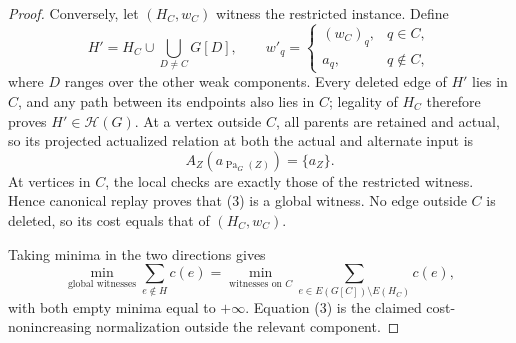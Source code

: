 \documentclass{article}
\begin{document}
\begin{proof}
Conversely, let \((H_C,w_C)\) witness the restricted instance. Define
\[
 H'=H_C\cup\bigcup_{D\ne C}G[D],
 \qquad
 w'_q=
 \begin{cases}
 (w_C)_q,&q\in C,\\
 a_q,&q\notin C,
 \end{cases} \tag{3}
\]
where \(D\) ranges over the other weak components. Every deleted edge of \(H'\) lies in \(C\), and any path between its endpoints also lies in \(C\); legality of \(H_C\) therefore proves \(H'\in\mathcal H(G)\). At a vertex outside \(C\), all parents are retained and actual, so its projected actualized relation at both the actual and alternate input is
\[
 A_Z(a_{\operatorname{Pa}_G(Z)})=\{a_Z\}. \tag{4}
\]
At vertices in \(C\), the local checks are exactly those of the restricted witness. Hence canonical replay proves that (3) is a global witness. No edge outside \(C\) is deleted, so its cost equals that of \((H_C,w_C)\).

Taking minima in the two directions gives
\[
 \min_{\text{global witnesses}}\sum_{e\notin H}c(e)
 =
 \min_{\text{witnesses on }C}\sum_{e\in E(G[C])\setminus E(H_C)}c(e), \tag{5}
\]
with both empty minima equal to \(+\infty\). Equation (3) is the claimed cost-nonincreasing normalization outside the relevant component.
\end{proof}
\end{document}
